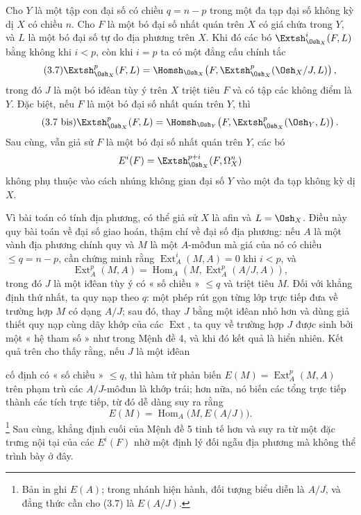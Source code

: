  Cho $Y$ là một tập con đại số có chiều
$q=n-p$ trong một đa tạp đại số không kỳ dị $X$ có chiều $n$. Cho
$F$ là một bó đại số nhất quán trên $X$ có giá chứa trong $Y$, và $L$
là một bó đại số tự do địa phương trên $X$. Khi đó các bó
$\Extsh_{\Osh_X}^{i}(F,L)$ bằng không khi $i<p$, còn khi $i=p$ ta có một
đẳng cấu chính tắc
\begin{equation}\tag{3.7}
  \Extsh_{\Osh_X}^{p}(F,L)
  =\Homsh_{\Osh_X}\!\left(F,
  \Extsh_{\Osh_X}^{p}(\Osh_X/J,L)\right),
\end{equation}
trong đó $J$ là một bó iđêan tùy ý trên $X$ triệt tiêu $F$ và có
tập các không điểm là $Y$. Đặc biệt, nếu $F$ là một bó đại số
nhất quán trên $Y$, thì
\begin{equation}\tag{3.7 bis}
  \Extsh_{\Osh_X}^{p}(F,L)
  =\Homsh_{\Osh_Y}\!\left(F,\Extsh_{\Osh_X}^{p}(\Osh_Y,L)\right).
\end{equation}
Sau cùng, vẫn giả sử $F$ là một bó đại số nhất quán trên $Y$, các bó
\[
  E^{i}(F)=\Extsh_{\Osh_X}^{p+i}(F,\Omega_X^{n})
\]
không phụ thuộc vào cách nhúng không gian đại số $Y$ vào một đa tạp
không kỳ dị $X$.

Vì bài toán có tính địa phương, có thể giả sử $X$ là afin và $L=\Osh_X$. Điều này quy
bài toán về đại số giao hoán, thậm chí về đại số địa phương: nếu $A$ là một
vành địa phương chính quy và $M$ là một $A$-môđun mà giá của nó có chiều
$\leq q=n-p$, cần chứng minh rằng $\operatorname{Ext}_{A}^{i}(M,A)=0$ khi $i<p$, và
\[
  \operatorname{Ext}_{A}^{p}(M,A)
  =\operatorname{Hom}_{A}\!\left(M,\operatorname{Ext}_{A}^{p}(A/J,A)\right),
\]
trong đó $J$ là một iđêan tùy ý có « số chiều » $\leq q$ và triệt tiêu $M$. Đối với
khẳng định thứ nhất, ta quy nạp theo $q$: một phép rút gọn từng lớp trực tiếp đưa
về trường hợp $M$ có dạng $A/J$; sau đó, thay $J$ bằng một iđêan nhỏ hơn
và dùng giả thiết quy nạp cùng dãy khớp của các
$\operatorname{Ext}$, ta quy về trường hợp $J$ được sinh bởi một « hệ tham số »
như trong Mệnh đề 4, và khi đó kết quả là hiển nhiên. Kết quả
trên cho thấy rằng, nếu $J$ là một iđêan

cố định có « số chiều » $\leq q$, thì hàm tử phản biến
$E(M)=\operatorname{Ext}_{A}^{p}(M,A)$ trên phạm trù các $A/J$-môđun là
khớp trái; hơn nữa, nó biến các tổng trực tiếp thành các tích trực tiếp,
từ đó dễ dàng suy ra rằng
\[
  E(M)=\operatorname{Hom}_{A}\bigl(M,E(A/J)\bigr).
\]
\footnote{Bản in ghi $E(A)$; trong nhánh hiện hành, đối tượng
biểu diễn là $A/J$, và đẳng thức cần cho (3.7) là $E(A/J)$.} Sau cùng,
khẳng định cuối của Mệnh đề 5 tinh tế hơn và suy ra từ một
đặc trưng nội tại của các $E^{i}(F)$ nhờ một định lý đối ngẫu
địa phương mà không thể trình bày ở đây.

